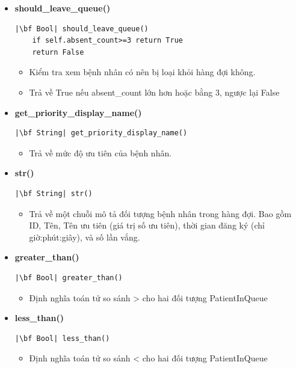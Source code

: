 \begin{itemize}
\begin{itemize}
\end{itemize}
    \item \textbf{should\_leave\_queue()}
\begin{verbatim}
|\bf Bool| should_leave_queue()
    if self.absent_count>=3 return True
    return False
\end{verbatim}
\begin{itemize}
    \item Kiểm tra xem bệnh nhân có nên bị loại khỏi hàng đợi không.
    \item Trả về True nếu absent\_count lớn hơn hoặc bằng 3, ngược lại False
\end{itemize}
\item \textbf{get\_priority\_display\_name()}
\begin{verbatim}
|\bf String| get_priority_display_name()
\end{verbatim}
\begin{itemize}
    \item Trả về mức độ ưu tiên của bệnh nhân.
\end{itemize}
\item \textbf{str()}
\begin{verbatim}
|\bf String| str()
\end{verbatim}
\begin{itemize}
    \item Trả về một chuỗi mô tả đối tượng bệnh nhân trong hàng đợi. Bao gồm ID, Tên, Tên ưu tiên (giá trị số ưu tiên), thời gian đăng ký (chỉ giờ:phút:giây), và số lần vắng.
\end{itemize}
\item \textbf{greater\_than()}
\begin{verbatim}
|\bf Bool| greater_than()
\end{verbatim}
\begin{itemize}
    \item Định nghĩa toán tử so sánh > cho hai đối tượng PatientInQueue
\end{itemize}
\item \textbf{less\_than()}
\begin{verbatim}
|\bf Bool| less_than()
\end{verbatim}
\begin{itemize}
    \item Định nghĩa toán tử so sánh < cho hai đối tượng PatientInQueue
\end{itemize}
\end{itemize}
